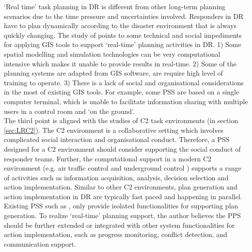 `Real time' task planning in \ac{DR} is different from other long-term planning scenarios due to the time pressure and uncertainties involved.  Responders in \ac{DR} have to plan dynamically according to the disaster environment that is always quickly changing. The study of \cite{Zerger2003} points to some technical and social impediments for applying \ac{GIS} tools to support `real-time' planning activities in \ac{DR}. 1) Some spatial modelling and simulation technologies \citep{Eglese1994} can be very computational intensive which makes it unable to provide results in real-time. 2) Some of the planning systems are adapted from \ac{GIS} software, are require high level of training to operate. 3) There is a lack of social and organisational considerations in the most of existing \ac{GIS} tools. For example, some \ac{PSS} are based on a single computer terminal, which is unable to facilitate information sharing with multiple users in a control room and `on the ground'. \\

The third point is aligned with the studies of \ac{C2} task environments (in section \ref{sec:LRC2}). The \ac{C2} environment is a collaborative setting which involves complicated social interaction and organisational conduct. Therefore, a \ac{PSS} designed for a \ac{C2} environment should consider supporting the social conduct of responder teams. Further, the computational support in a modern \ac{C2} environment (e.g. air traffic control \citep{Mercer2014} and underground control \citep{Sharples2011}) supports a range of activities such as information acquisition, analysis, decision selection and action implementation. Similar to other \ac{C2} environments, plan generation and action implementation in DR are typically fast paced and happening in parallel. Existing \ac{PSS} such as \citep{IntergraphCorporation2000}, \citep{Eglese1994} only provide isolated functionalities for supporting plan generation. To realize `real-time' planning support, the author believes the PPS should be further extended or integrated with other system functionalities for action implementation, such as progress monitoring, conflict detection, and communication support.\\


